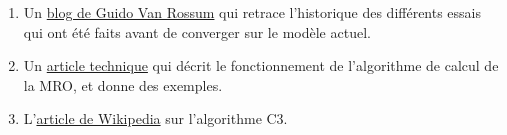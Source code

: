     \begin{enumerate}
\def\labelenumi{\arabic{enumi}.}
\setcounter{enumi}{-1}
\tightlist
\item
  Un
  \href{http://python-history.blogspot.fr/2010/06/method-resolution-order.html}{blog
  de Guido Van Rossum} qui retrace l'historique des différents essais
  qui ont été faits avant de converger sur le modèle actuel.
\item
  Un \href{https://www.python.org/download/releases/2.3/mro/}{article
  technique} qui décrit le fonctionnement de l'algorithme de calcul de
  la MRO, et donne des exemples.
\item
  L'\href{http://en.wikipedia.org/wiki/C3_linearization}{article de
  Wikipedia} sur l'algorithme C3.
\end{enumerate}


    
    
    
